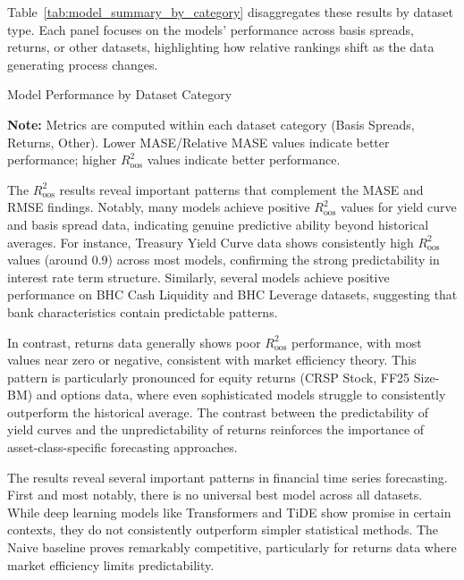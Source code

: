 \documentclass{article}
\begin{document}
Table~\ref{tab:model_summary_by_category} disaggregates these results by dataset type. Each panel focuses on the models' performance across basis spreads, returns, or other datasets, highlighting how relative rankings shift as the data generating process changes.

\begin{table}[htbp]
\centering
\caption{Model Performance by Dataset Category}
\label{tab:model_summary_by_category}
\scriptsize

\caption*{\scriptsize \textbf{Note:} Metrics are computed within each dataset category (Basis Spreads, Returns, Other). Lower MASE/Relative MASE values indicate better performance; higher $R^2_{\text{oos}}$ values indicate better performance.}
\end{table}

The $R^2_{\text{oos}}$ results reveal important patterns that complement the MASE and RMSE findings. Notably, many models achieve positive $R^2_{\text{oos}}$ values for yield curve and basis spread data, indicating genuine predictive ability beyond historical averages. For instance, Treasury Yield Curve data shows consistently high $R^2_{\text{oos}}$ values (around 0.9) across most models, confirming the strong predictability in interest rate term structure. Similarly, several models achieve positive performance on BHC Cash Liquidity and BHC Leverage datasets, suggesting that bank characteristics contain predictable patterns.

In contrast, returns data generally shows poor $R^2_{\text{oos}}$ performance, with most values near zero or negative, consistent with market efficiency theory. This pattern is particularly pronounced for equity returns (CRSP Stock, FF25 Size-BM) and options data, where even sophisticated models struggle to consistently outperform the historical average. The contrast between the predictability of yield curves and the unpredictability of returns reinforces the importance of asset-class-specific forecasting approaches.


The results reveal several important patterns in financial time series forecasting. First and most notably, there is no universal best model across all datasets. While deep learning models like Transformers and TiDE show promise in certain contexts, they do not consistently outperform simpler statistical methods. The Naive baseline proves remarkably competitive, particularly for returns data where market efficiency limits predictability.
\end{document}

